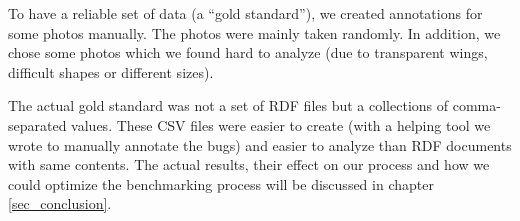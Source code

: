 To have a reliable set of data (a ``gold standard''), we created annotations for some photos manually. 
The photos were mainly taken randomly. 
In addition, we chose some photos which we found hard to analyze (due to transparent wings, difficult shapes or different sizes).

The actual gold standard was not a set of RDF files but a collections of comma-separated values. 
These CSV files were easier to create (with a helping tool we wrote to manually annotate the bugs) and easier to analyze than RDF documents with same contents.
The actual results, their effect on our process and how we could optimize the benchmarking process will be discussed in chapter \ref{sec_conclusion}.